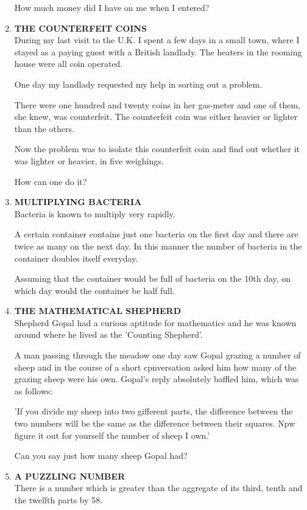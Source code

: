\documentclass[12pt]{article}
\begin{document}
\begin{enumerate}
How  much  money  did I have  on me when  I entered? 
%
\item \textbf{THE  COUNTERFEIT  COINS} \\ 
During  my last visit  to the U.K.  I spent  a few  days  in a small  town,  where  I stayed  as a paying  guest  with  a British landlady.  The  heaters  in the  rooming  house  were  all coin operated. 

One day my landlady  requested  my help  in sorting  out a problem. 

There  were  one  hundred  and  twenty  coins  in her gas-meter  and one of them,  she knew,  was  counterfeit.  The counterfeit  coin  was  either  heavier  or lighter  than  the others.

Now  the problem  was  to isolate  this  counterfeit  coin and find  out  whether  it was  lighter  or heavier,  in five weighings. 

How  can one do it? 

\item \textbf{MULTIPLYING  BACTERIA} \\
Bacteria  is known  to multiply  very  rapidly. 

A certain  container  contains  just  one bacteria  on the first day and there  are twice  as many  on the next  day.  In this manner  the number  of bacteria  in the  container doubles  itself  everyday. 

Assuming  that  the  container  would  be full of bacteria on the 10th  day,  on which  day  would  the  container  be half full. 


\item \textbf{THE  MATHEMATICAL  SHEPHERD} \\
Shepherd  Gopal  had  a curious  aptitude  for mathematics and he was known  around  where  he lived  as the 'Counting Shepherd'. 

A man  passing  through  the  meadow  one  day  saw Gopal  grazing  a number  of sheep  and in the course  of a short  cpnversation  asked  him  how  many  of the grazing sheep  were  his own.  Gopal's  reply  absolutely  baffled  him, which  was  as follows: 

'If you  divide  my sheep  into  two gifferent  parts,  the difference  between  the  two  numbers  will  be the same  as the difference  between  their  squares. Npw  figure  it out for yourself  the number  of sheep  I own.' 

Can you say just how  many  sheep  Gopal  had? 
%
\item \textbf{A PUZZLING  NUMBER} \\
There  is a number  which  is greater  than  the  aggregate  of its third,  tenth  and the twelfth  parts  by 58. 


\end{enumerate}
\end{document}
